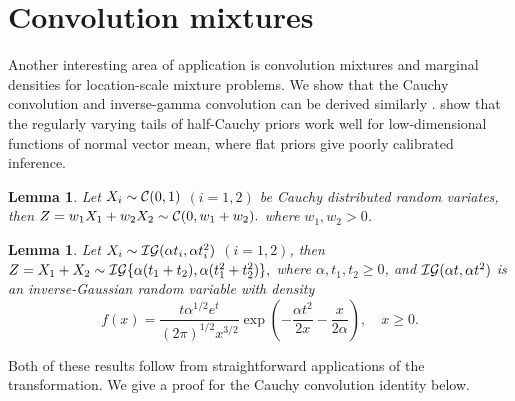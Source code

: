 \documentclass[bj]{imsart}
\newtheorem{lemma}[theorem]{Lemma}
\begin{document}
\section{Convolution mixtures}
\label{sec:convolutions}

Another interesting area of application is convolution mixtures and marginal densities for location-scale mixture problems. We show that the Cauchy
convolution \citep{pillai2015unexpected} and inverse-gamma convolution can be derived similarly \citep{polson_halfcauchy_2012}. \citet{bhadra_default_2016} show that the regularly varying tails of half-Cauchy priors work well for low-dimensional functions of normal vector mean, where flat priors give poorly calibrated inference. 
\begin{lemma}
  Let $X_i \sim \mathcal{C}(0,1)$ $(i = 1, 2)$ be Cauchy distributed random variates, then $Z = w_1 X_1 + w_2 X_2 \sim \mathcal{C}( 0, w_1 + w_2).$ where $w_1,w_2 > 0$.
\end{lemma}
\begin{lemma}
  Let $X_i \sim \mathcal{IG}(\alpha t_i, \alpha t_i^2)$ $(i = 1, 2)$, then $Z = X_1 + X_2 \sim \mathcal{IG}\{\alpha (t_1 + t_2), \alpha (t_1^2+t_2^2)\},$ where $\alpha, t_1, t_2 \geq 0$, and $\mathcal{IG}(\alpha t, \alpha t^2)$ is an inverse-Gaussian random variable with density
\[
    f(x) = \frac{t \alpha^{1/2} e^t}{(2 \pi)^{1/2} x^{3/2}} 
    \exp\left( -\frac{\alpha t^2}{2x} - \frac{x}{2\alpha} \right), \quad x \geq 0.
\]
\end{lemma}

Both of these results follow from straightforward applications of the \CS{} 
transformation. We give a proof for the Cauchy convolution identity below.
\end{document}
